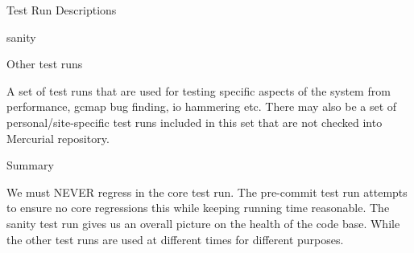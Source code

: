 \begin{section}{Test Run Descriptions}
\begin{subsection}{sanity}
\end{subsection}

\begin{subsection}{Other test runs}

A set of test runs that are used for testing specific aspects of the system from performance, gcmap bug finding, io hammering etc. There may also be a set of personal/site-specific test runs included in this set that are not checked into Mercurial repository.

\end{subsection}

\begin{subsection}{Summary}

We must NEVER regress in the core test run. The pre-commit test run attempts to ensure no core regressions this while keeping running time reasonable. The sanity test run gives us an overall picture on the health of the code base. While the other test runs are used at different times for different purposes.

\end{subsection}

\end{section}